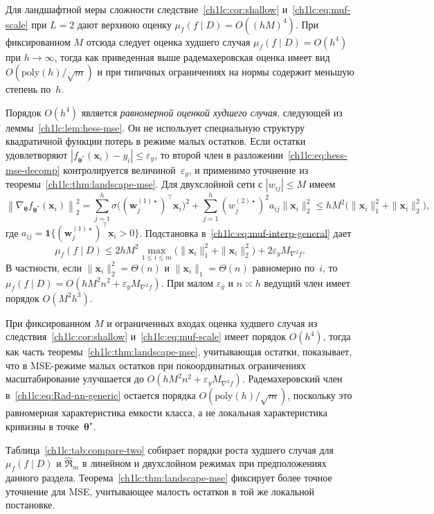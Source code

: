 Для ландшафтной меры сложности следствие~\ref{ch1lc:cor:shallow} и~\eqref{ch1lc:eq:muf-scale} при $L=2$ дают верхнюю оценку $\mu_f(f\mid D)=O((hM)^{4})$.
При фиксированном $M$ отсюда следует оценка худшего случая $\mu_f(f\mid D)=O(h^4)$ при $h\to\infty$, тогда как приведенная выше радемахеровская оценка имеет вид $O(\mathrm{poly}(h)/\sqrt{m})$ и при типичных ограничениях на нормы содержит меньшую степень по~$h$.

Порядок $O(h^4)$ является \emph{равномерной оценкой худшего случая}, следующей из леммы~\ref{ch1lc:lem:hess-mse}. Он не использует специальную структуру квадратичной функции потерь в режиме малых остатков.
Если остатки удовлетворяют $|f_{\boldsymbol{\theta}^*}(\mathbf{x}_i)-y_i|\le \varepsilon_y$, то второй член в разложении~\eqref{ch1lc:eq:hess-mse-decomp} контролируется величиной~$\varepsilon_y$, и применимо уточнение из теоремы~\ref{ch1lc:thm:landscape-mse}.
Для двухслойной сети с $|w_{ij}|\le M$ имеем
\[
  \left\|\nabla_{\boldsymbol{\theta}}f_{\boldsymbol{\theta}^*}(\mathbf{x}_i)\right\|_2^2
  = \sum_{j=1}^{h}\sigma\!\bigl((\mathbf{w}^{(1)\star}_j)^{\top}\mathbf{x}_i\bigr)^2
    + \sum_{j=1}^{h}(w_j^{(2)\star})^2 a_{ij}\|\mathbf{x}_i\|_2^2
  \le hM^2\bigl(\|\mathbf{x}_i\|_1^2+\|\mathbf{x}_i\|_2^2\bigr),
\]
где $a_{ij}=\mathbf{1}\{(\mathbf{w}^{(1)\star}_j)^\top \mathbf{x}_i>0\}$.
Подстановка в~\eqref{ch1lc:eq:muf-interp-general} дает
\[
  \mu_f(f\mid D)
  \le 2hM^2\max_{1\le i\le m}\bigl(\|\mathbf{x}_i\|_1^2+\|\mathbf{x}_i\|_2^2\bigr)
     + 2\varepsilon_y M_{\nabla^2 f}.
\]
В частности, если $\|\mathbf{x}_i\|_2^2=\Theta(n)$ и $\|\mathbf{x}_i\|_1=\Theta(n)$ равномерно по~$i$, то
$\mu_f(f\mid D)=O(hM^2n^2 + \varepsilon_y M_{\nabla^2 f})$. При малом $\varepsilon_y$ и $n\asymp h$ ведущий член имеет порядок $O(M^2h^3)$.

При фиксированном $M$ и ограниченных входах оценка худшего случая из следствия~\ref{ch1lc:cor:shallow} и~\eqref{ch1lc:eq:muf-scale} имеет порядок $O(h^4)$, тогда как часть теоремы~\ref{ch1lc:thm:landscape-mse}, учитывающая остатки, показывает, что в MSE-режиме малых остатков при покоординатных ограничениях масштабирование улучшается до $O(hM^2n^2 + \varepsilon_y M_{\nabla^2 f})$.
Радемахеровский член в~\eqref{ch1lc:eq:Rad-nn-generic} остается порядка $O(\mathrm{poly}(h)/\sqrt{m})$, поскольку это равномерная характеристика емкости класса, а не локальная характеристика кривизны в точке~$\boldsymbol{\theta}^\star$.

Таблица~\ref{ch1lc:tab:compare-two} собирает порядки роста худшего случая для $\mu_f(f\mid D)$ и $\hat{\mathfrak{R}}_m$ в линейном и двухслойном режимах при предположениях данного раздела. Теорема~\ref{ch1lc:thm:landscape-mse} фиксирует более точное уточнение для MSE, учитывающее малость остатков в той же локальной постановке.

